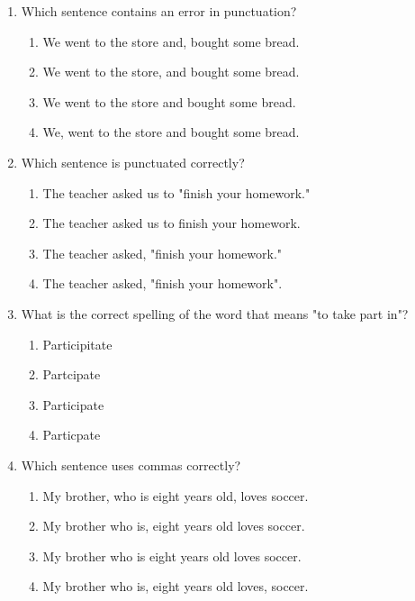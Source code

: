 \documentclass[12pt]{article}
\begin{document}
\begin{enumerate}
\vspace{0.5cm}

\item Which sentence contains an error in punctuation?
\begin{enumerate}[label=\Alph*.]
    \item We went to the store and, bought some bread.
    \item We went to the store, and bought some bread.
    \item We went to the store and bought some bread.
    \item We, went to the store and bought some bread.
\end{enumerate}

\vspace{0.5cm}

\item Which sentence is punctuated correctly?
\begin{enumerate}[label=\Alph*.]
    \item The teacher asked us to "finish your homework."
    \item The teacher asked us to finish your homework.
    \item The teacher asked, "finish your homework."
    \item The teacher asked, "finish your homework".
\end{enumerate}

\vspace{0.5cm}

\item What is the correct spelling of the word that means "to take part in"?
\begin{enumerate}[label=\Alph*.]
    \item Participitate
    \item Partcipate
    \item Participate
    \item Particpate
\end{enumerate}

\vspace{0.5cm}

\item Which sentence uses commas correctly?
\begin{enumerate}[label=\Alph*.]
    \item My brother, who is eight years old, loves soccer.
    \item My brother who is, eight years old loves soccer.
    \item My brother who is eight years old loves soccer.
    \item My brother who is, eight years old loves, soccer.
\end{enumerate}


\end{enumerate}
\end{document}
